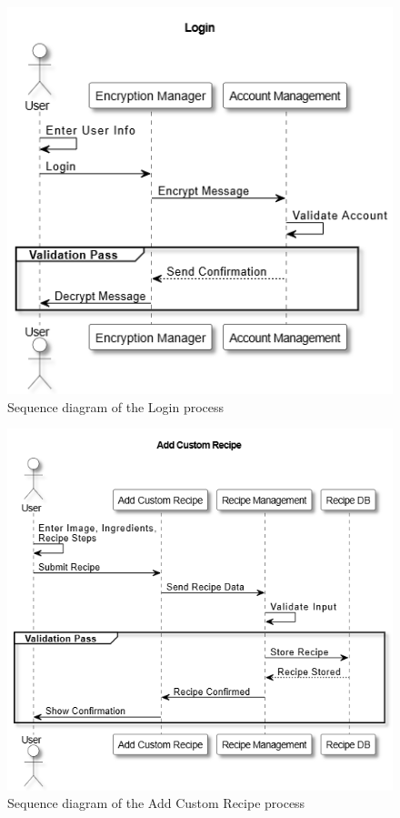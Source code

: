 \documentclass[]{article}
\begin{document}
\begin{figure}[H]
	\centering
	\includegraphics[width=\textwidth]{image/D3_sequence_diagrams/login.drawio.png}
	\caption{Sequence diagram of the Login process}
	\label{fig:login_sequence}
\end{figure}

\begin{figure}[H]
	\centering
	\includegraphics[width=\textwidth]{image/D3_sequence_diagrams/add_custom_recipe.png}
	\caption{Sequence diagram of the Add Custom Recipe process}
	\label{fig:add_custom_recipe_sequence}
\end{figure}
\end{document}
